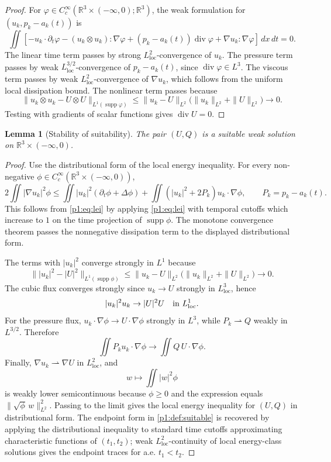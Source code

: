 \documentclass[11pt]{amsart}
\theoremstyle{plain}
\newtheorem{lemma}[lemma]{Lemma}
\theoremstyle{definition}
\theoremstyle{remark}
\numberwithin{equation}{section}
\newcommand{\R}{\mathbb R}
\newcommand{\loc}{\mathrm{loc}}
\newcommand{\supp}{\operatorname{supp}}
\newcommand{\divergence}{\operatorname{div}}
\begin{document}
\begin{proof}
For \(\varphi\in C_c^\infty(\R^3\times(-\infty,0);\R^3)\), the weak
formulation for \((u_k,p_k-a_k(t))\) is
\[
   \iint\left[
      -u_k\cdot\partial_t\varphi
      -(u_k\otimes u_k):\nabla\varphi
      +(p_k-a_k(t))\divergence\varphi
      +\nabla u_k:\nabla\varphi
   \right]\,dx\,dt=0.
\]
The linear time term passes by strong \(L^2_{\loc}\)-convergence of \(u_k\).
The pressure term passes by weak \(L^{3/2}_{\loc}\)-convergence of
\(p_k-a_k(t)\), since \(\divergence\varphi\in L^3\).  The viscous term passes
by weak \(L^2_{\loc}\)-convergence of \(\nabla u_k\), which follows from the
uniform local dissipation bound.  The nonlinear term
passes because
\[
   \|u_k\otimes u_k-U\otimes U\|_{L^1(\supp\varphi)}
   \le
   \|u_k-U\|_{L^2}
   \bigl(\|u_k\|_{L^2}+\|U\|_{L^2}\bigr)\to0.
\]
Testing with gradients of scalar functions gives \(\divergence U=0\).
\end{proof}

\begin{lemma}[Stability of suitability]\label{p1:lem:suitability}
The pair \((U,Q)\) is a suitable weak solution on
\(\R^3\times(-\infty,0)\).
\end{lemma}

\begin{proof}
Use the distributional form of the local energy inequality.  For every
non-negative \(\phi\in C_c^\infty(\R^3\times(-\infty,0))\),
\[
   2\iint |\nabla u_k|^2\phi
   \le
   \iint |u_k|^2(\partial_t\phi+\Delta\phi)
   +\iint (|u_k|^2+2P_k)u_k\cdot\nabla\phi ,
   \qquad P_k=p_k-a_k(t).
\]
This follows from \eqref{p1:eq:lei} by applying \eqref{p1:eq:lei} with temporal
cutoffs which increase to \(1\) on the time projection of \(\supp\phi\).  The
monotone convergence theorem passes the nonnegative dissipation term to the
displayed distributional form.

The terms with \(|u_k|^2\) converge strongly in \(L^1\) because
\[
   \||u_k|^2-|U|^2\|_{L^1(\supp\phi)}
   \le
   \|u_k-U\|_{L^2}
   \bigl(\|u_k\|_{L^2}+\|U\|_{L^2}\bigr)\to0.
\]
The cubic flux converges strongly since \(u_k\to U\) strongly in
\(L^3_{\loc}\), hence
\[
   |u_k|^2u_k\to |U|^2U
   \quad\hbox{in }L^1_{\loc}.
\]
For the pressure flux, \(u_k\cdot\nabla\phi\to U\cdot\nabla\phi\) strongly in
\(L^3\), while \(P_k\rightharpoonup Q\) weakly in \(L^{3/2}\).  Therefore
\[
   \iint P_k u_k\cdot\nabla\phi\to
   \iint Q\,U\cdot\nabla\phi .
\]
Finally,
\(\nabla u_k\rightharpoonup\nabla U\) in \(L^2_{\loc}\), and
\[
   w\mapsto\iint |w|^2\phi
\]
is weakly lower semicontinuous because \(\phi\ge0\) and the expression equals
\(\|\sqrt{\phi}\,w\|_{L^2}^2\).  Passing to the limit gives the local energy
inequality for \((U,Q)\) in distributional form.  The endpoint form in
\cref{p1:def:suitable} is recovered by applying the distributional inequality to
standard time cutoffs approximating characteristic functions of
\((t_1,t_2)\); weak \(L^2_{\loc}\)-continuity of local energy-class solutions
gives the endpoint traces for a.e. \(t_1<t_2\).
\end{proof}
\end{document}
